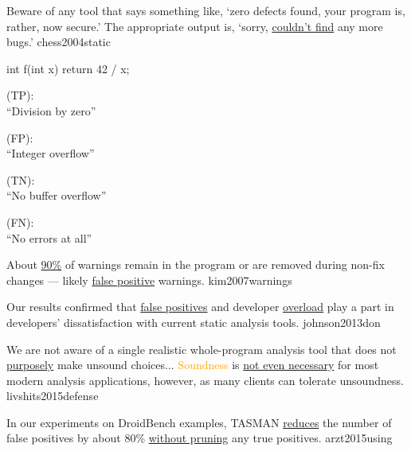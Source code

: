 \documentclass{article}
\begin{document}

  {Beware of any tool that says something like, `zero defects found, your program is, rather, now secure.' The appropriate output is, `sorry, \ul{couldn’t find} any more bugs.'}
  {chess2004static}

\begin{multicols}{2}
{\small\begin{ffcode}
int f(int x) {
  return 42 / x;
}
\end{ffcode}
}
\par\columnbreak\par
\textcolor{green}{} (TP): \\ ``Division by zero''\par
\textcolor{red}{} (FP): \\ ``Integer overflow''\par
\textcolor{green}{} (TN): \\ ``No buffer overflow''\par
\textcolor{red}{} (FN): \\ ``No errors at all''\par
\end{multicols}
\plush{}

  {About \ul{90\%} of warnings remain in the program or are removed during non-fix changes --- likely \ul{false positive} warnings.}
  {kim2007warnings}

  {Our results confirmed that \ul{false positives} and developer \ul{overload} play a part in developers' dissatisfaction with current static analysis tools.}
  {johnson2013don}

  {We are not aware of a single realistic whole-program analysis tool that does not \ul{purposely} make unsound choices... \textcolor{orange}{Soundness} is \ul{not even necessary} for most modern analysis applications, however, as many clients can tolerate unsoundness.}
  {livshits2015defense}

  {In our experiments on DroidBench examples, TASMAN \ul{reduces} the number of false positives by about 80\% \ul{without pruning} any true positives.}
  {arzt2015using}
\end{document}
